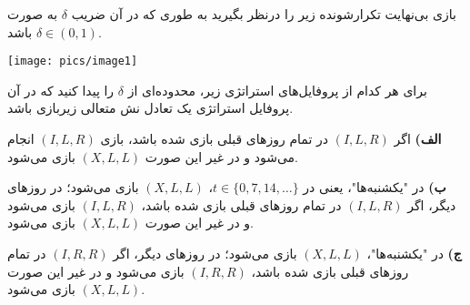 بازی بی‌نهایت تکرارشونده زیر را درنظر بگیرید به طوری که در آن ضریب
$\delta$
به صورت 
$\delta \in (0, 1)$
باشد.

\begin{center}
    \texttt{[image: pics/image1]}
\end{center}

برای هر کدام از پروفایل‌های استراتژی زیر، محدوده‌ای از
$\delta$
را پیدا کنید که در آن پروفایل استراتژی یک تعادل نش متعالی زیربازی باشد.

\vspace*{5pt}
\textbf{الف)}
اگر
$(I, L, R)$
در تمام روزهای قبلی بازی شده باشد، بازی
$(I, L, R)$
انجام می‌شود و در غیر این صورت
$(X, L, L)$
بازی می‌شود.

\vspace*{5pt}
\textbf{ب)}
در "یکشنبه‌ها"، یعنی در 
$t \in \{0,7,14, \ldots\}$،
$(X, L, L)$
بازی می‌شود؛ در روزهای دیگر، اگر
$(I, L, R)$
در تمام روزهای قبلی بازی شده باشد،
$(I, L, R)$
بازی می‌شود و در غیر این صورت
$(X, L, L)$
بازی می‌شود.

\vspace*{5pt}
\textbf{ج)}
در "یکشنبه‌ها"،
$(X, L, L)$
بازی می‌شود؛ در روزهای دیگر، اگر
$(I, R, R)$
در تمام روزهای قبلی بازی شده باشد،
$(I, R, R)$
بازی می‌شود و در غیر این صورت
$(X, L, L)$
بازی می‌شود.